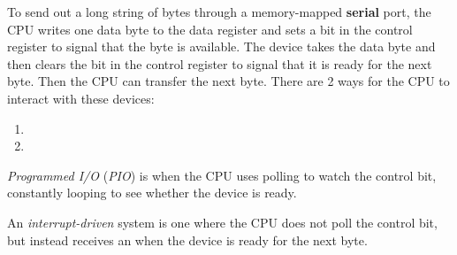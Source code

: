 To send out a long string of bytes through a memory-mapped \textbf{serial} port, the CPU writes one data byte to the data register and sets a bit in the control register to signal that the byte is available.
The device takes the data byte and then clears the bit in the control register to signal that it is ready for the next byte.
Then the CPU can transfer the next byte.
There are 2 ways for the CPU to interact with these devices:
\begin{enumerate}[noitemsep]
\item {}
\item {}
\end{enumerate}

\begin{definition}[Programmed I/O]\label{def:Programmed_IO}
  \emph{Programmed I/O} (\emph{PIO}) is when the CPU uses polling to watch the control bit, constantly looping to see whether the device is ready.
\end{definition}

\begin{definition}\label{def:Interrupt_Driven}
  An \emph{interrupt-driven} system is one where the CPU does not poll the control bit, but instead receives an  when the device is ready for the next byte.
\end{definition}


